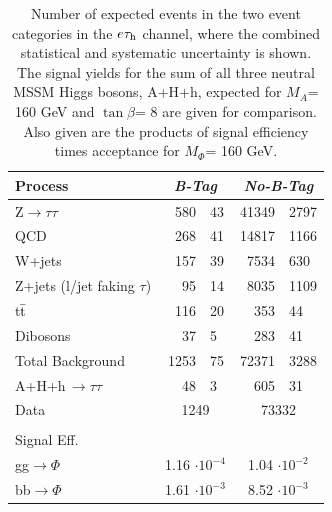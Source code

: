 \vspace*{-0.2cm}
\begin{table}[!h]
  \begin{center}
    \caption{Number of expected events in the two event categories in the $e\mathrm{\tau}_{\rm h}$ channel, where the combined statistical and systematic uncertainty is shown. 
      The signal yields for the sum of all three neutral MSSM Higgs bosons, A+H+h, expected for $M_{A}$= 160 GeV and $\tan\beta$= 8 are given for comparison.
      Also given are the products of signal efficiency times acceptance for $M_{\Phi}$= 160 GeV.}
\begin{tabular}{|l|r@{$ \,\,\pm\,\, $}l|r@{$ \,\,\pm\,\, $}l|} 
\hline 
Process & \multicolumn{2}{c|}{\emph{B-Tag}} & \multicolumn{2}{c|}{\emph{No-B-Tag}}\\ 
\hline 
Z$\rightarrow \tau\tau$          &       580     &       43      &       41349   &       2797    \\ 
\hline 
QCD                              &       268     &       41      &       14817   &       1166    \\ 
\hline 
W+jets                           &       157     &       39      &       7534    &       630     \\ 
\hline 
Z+jets (l/jet faking $\tau$)     &       95      &       14      &       8035    &       1109    \\ 
\hline 
t$\bar{\rm{t}}$                  &       116     &       20      &       353     &       44      \\ 
\hline 
Dibosons                         &       37      &       5       &       283     &       41      \\ 
\hline 
\hline 
Total Background                 &       1253    &       75      &       72371   &       3288    \\ 
\hline 
A+H+h\,$\rightarrow\tau\tau$       &       48      &       3     &       605     &       31       \\ 
\hline 
Data                             & \multicolumn{2}{|c|}{1249}    & \multicolumn{2}{|c|}{73332}   \\ 
\hline 
\multicolumn{5}{c}{ } \\
\multicolumn{2}{l}{Signal Eff.} &  \multicolumn{3}{c}{ } \\
\hline
gg$\rightarrow\Phi$                &       \multicolumn{2}{|c|}{1.16 $\cdot 10^{-4}$}      &       \multicolumn{2}{|c|}{1.04 $\cdot 10^{-2}$}\\ 
\hline 
bb$\rightarrow\Phi$                &       \multicolumn{2}{|c|}{1.61 $\cdot 10^{-3}$}      &       \multicolumn{2}{|c|}{8.52 $\cdot 10^{-3}$}\\ 
\hline 
\end{tabular} 
\label{table:events_etau} 
\end{center} 
\end{table} 

